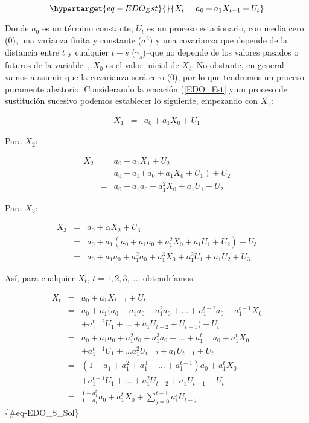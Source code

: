 \documentclass[
  a4paper,
]{article}
\begin{document}
\begin{equation}\protect\hypertarget{eq-EDO_Est}{}{
X_t = a_0 + a_1 X_{t-1} + U_t
}\label{eq-EDO_Est}\end{equation}

Donde \(a_0\) es un término constante, \(U_t\) es un proceso
estacionario, con media cero (0), una varianza finita y constante
(\(\sigma^2\)) y una covarianza que depende de la distancia entre \(t\)
y cualquier \(t-s\) (\(\gamma_s\))--que no depende de los valores
pasados o futuros de la variable--, \(X_0\) es el valor inicial de
\(X_t\). No obstante, en general vamos a asumir que la covarianza será
cero (0), por lo que tendremos un proceso puramente aleatorio.
Considerando la ecuación (\ref{EDO_Est} y un proceso de sustitución
sucesivo podemos establecer lo siguiente, empezando con \(X_1\):

\begin{eqnarray*}
    X_{1} & = & a_0 + a_1 X_{0} + U_{1}
\end{eqnarray*}

Para \(X_2\):

\begin{eqnarray*}
X_{2} & = & a_0 + a_1 X_{1} + U_{2} \\
    & = & a_0 + a_1 (a_0 + a_1 X_{0} + U_{1}) + U_{2} \\
    & = & a_0 + a_1 a_0 + a_1^2 X_{0} + a_1 U_{1} + U_{2}
\end{eqnarray*}

Para \(X_3\):

\begin{eqnarray*}
X_{3} & = & a_0 + \alpha X_{2} + U_{3} \\
    & = & a_0 + a_1 (a_0 + a_1 a_0 + a_1^2 X_{0} + a_1 U_{1} + U_{2}) + U_{3} \\
    & = & a_0 + a_1 a_0 + a_1^2 a_0 + a_1^3 X_{0} + a_1^2 U_{1} + a_1 U_{2} + U_{3}
\end{eqnarray*}

Así, para cualquier \(X_t\), \(t = 1, 2, 3, \ldots\), obtendríamos:

\begin{eqnarray}
X_{t} & = & a_0 + a_1 X_{t - 1} + U_{t} \nonumber \\
    & = & a_0 + a_1 (a_0 + a_1 a_0 + a_1^2 a_0 + \ldots + a_1^{t-2} a_0 + a_1^{t-1} X_{0} \nonumber \\
    &   & + a_1^{t-2} U_{1} + \ldots + a_1 U_{t - 2} + U_{t - 1}) + U_{t} \nonumber \\
    & = & a_0 + a_1 a_0 + a_1^2 a_0 + a_1^3 a_0 + \ldots + a_1^{t-1} a_0 + a_1^{t} X_{0} \nonumber \\
    &   & + a_1^{t-1} U_{1} + \ldots a_1^2 U_{t - 2} + a_1 U_{t - 1} + U_{t} \nonumber \\
    & = & (1 + a_1 + a_1^2 + a_1^3 + \ldots + a_1^{t-1}) a_0 + a_1^{t} X_{0} \nonumber \\
    &   & + a_1^{t-1} U_{1} + \ldots + a_1^2 U_{t - 2} + a_1 U_{t - 1} + U_{t}  \nonumber\\
    & = & \frac{1 - a_1^t}{1 - a_1} a_0 + a_1^{t} X_{0} + \sum^{t-1}_{j = 0} a_1^{j} U_{t - j} 
\end{eqnarray} \{\#eq-EDO\_S\_Sol\}
\end{document}
